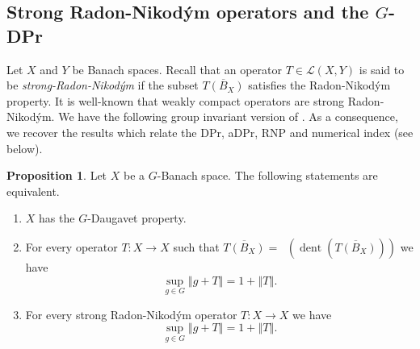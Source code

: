 \documentclass[a4paper,12pt]{amsart}
\theoremstyle{definition}
\newtheorem{proposition}[theorem]{Proposition}
\theoremstyle{definition}
\theoremstyle{remark}
\numberwithin{equation}{section}
\newcommand{\clco}{\mathop{\overline{\mathrm{co}}}\nolimits}
\newcommand{\<}{\langle}
\renewcommand{\>}{\rangle}
\newcommand{\norm}[1]{\left\Vert#1\right\Vert}
\newcommand{\dent}[1]{\operatorname{dent}\left(#1\right)}
\begin{document}
	\subsection{Strong Radon-Nikodým operators and the $G$-DPr} Let $X$ and $Y$ be Banach spaces. Recall that an operator $T \in \mathcal{L}(X,Y)$ is said to be {\it strong-Radon-Nikodým} if the subset $\overline{T(B_X)}$ satisfies the Radon-Nikodým property. It is well-known that weakly compact operators are strong Radon-Nikodým. We have the following group invariant version of \cite[Theorem 3.2.6 and Proposition 12.3.7]{KMRW}. As a consequence, we recover the results which relate the DPr, aDPr, RNP and numerical index (see  below).
	
	\begin{proposition} \label{prop:sRN-Operators}
		Let $X$ be a $G$-Banach space. The following statements are equivalent. 
		\begin{enumerate}
			\item $X$ has the $G$-Daugavet property.
			
			\item For every operator $T: X \to X$ such that $\overline{T(B_X)} = \clco\left(\dent{\overline{T(B_X)}}\right)$ we have
			\begin{equation*}
				\sup_{g \in G} \norm{g + T} = 1 + \norm{T}.
			\end{equation*}
			
			\item For every strong Radon-Nikodým operator $T : X \to X$ we have
			\begin{equation*}
				\sup_{g \in G} \norm{g + T} = 1 + \norm{T}.
			\end{equation*}
		\end{enumerate}
	\end{proposition}
\end{document}
